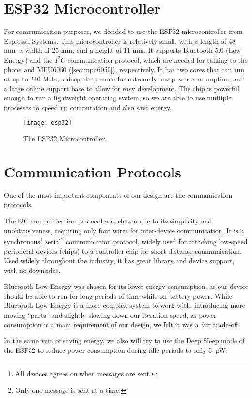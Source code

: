 \section{ESP32 Microcontroller}

For communication purposes, we decided to use the ESP32 microcontroller from
Espressif Systems. This microcontroller is relatively small, with a length of 48
mm, a width of 25 mm, and a height of 11 mm. It supports
Bluetooth 5.0 (Low Energy) and the $I^2C$ communication protocol, which are needed
for talking to the phone and MPU6050 (\autoref{sec:mpu6050}), respectively. It
has two cores that can run at up to 240 MHz, a deep sleep mode for extremely low
power consumption, and a large online support base to allow for easy
development. The chip is powerful enough to run a lightweight operating system,
so we are able to use multiple processes to speed up computation and also save
energy.

\begin{figure}[h]
  \centering
  \texttt{[image: esp32]}
  \caption{The ESP32 Microcontroller.}
\end{figure}

\section{Communication Protocols}

One of the most important components of our design are the communication
protocols.

The I2C communication protocol was chosen due to its simplicity and
unobtrusiveness, requiring only four wires for inter-device communication. It is
a synchronous\footnote{All devices agrees on when messages are sent.}
serial\footnote{Only one message is sent at a time.} communication protocol,
widely used for attaching low-speed peripheral devices (chips) to a controller
chip for short-distance communication. Used widely throughout the industry, it
has great library and device support, with no downsides.

Bluetooth Low-Energy was chosen for its lower energy consumption, as our device
should be able to run for long periods of time while on battery power. While
Bluetooth Low-Energy is a more complex system to work with, introducing more
moving ``parts'' and slightly slowing down our iteration speed, as power
consumption is a main requirement of our design, we felt it was a fair
trade-off.

In the same vein of saving energy, we also will try to use the Deep
Sleep mode of the ESP32 to reduce power consumption during idle periods to only
\qty{5}{\uW}.

